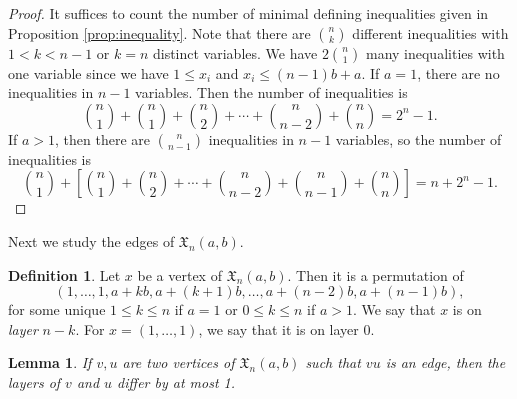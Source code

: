 \documentclass[11pt]{amsart}
\newtheorem{lemma}[theorem]{Lemma}
\theoremstyle{definition}
\newtheorem{definition}[theorem]{Definition}
\newcommand{\0}{\emptyset}
\newcommand{\Xn}{\mathfrak{X}_{n}(a,b)}
\begin{document}
\begin{proof} 
It suffices to count the number of minimal defining inequalities given in Proposition \ref{prop:inequality}. Note that there are $\binom{n}{k}$ different inequalities with $1 < k < n-1$ or $k=n$ distinct variables. We have $2\binom{n}{1}$ many inequalities with one variable since we have $1\leq x_i$ and $x_i \leq (n-1)b + a$.
If $a=1$, there are no inequalities in $n-1$ variables. Then the number of inequalities is
\[ \binom{n}{1} + \binom{n}{1} + \binom{n}{2} + \cdots + \binom{n}{n-2} + \binom{n}{n} = 2^n-1.\]
If $a > 1$, then there are $\binom{n}{n-1}$ inequalities in $n-1$ variables, so the number of inequalities is
\[ \binom{n}{1} +  \left[\binom{n}{1} + \binom{n}{2} + \cdots + \binom{n}{n-2} + \binom{n}{n-1}+ \binom{n}{n} \right] = n + 2^n-1.\]
\end{proof}

Next we study the edges of $\Xn$.

\begin{definition}
Let $x$ be a vertex of $\Xn$.
Then it is a permutation of 
\[(1, \ldots, 1, a+kb, a+(k+1)b, \ldots, a+(n-2)b, a+(n-1)b),\]
for some unique $1 \leq k \leq n$ if $a=1$ or $0 \leq k \leq n$ if $a>1$. We say that $x$ is on \textit{layer} $n-k$. For $x = (1, \ldots, 1)$, we say that it is on layer 0.
\end{definition}


\begin{lemma}
If $v,u$ are two vertices of $\Xn$ such that $vu$ is an edge, then the layers of $v$ and $u$ differ by at most 1.
\end{lemma}
\end{document}
